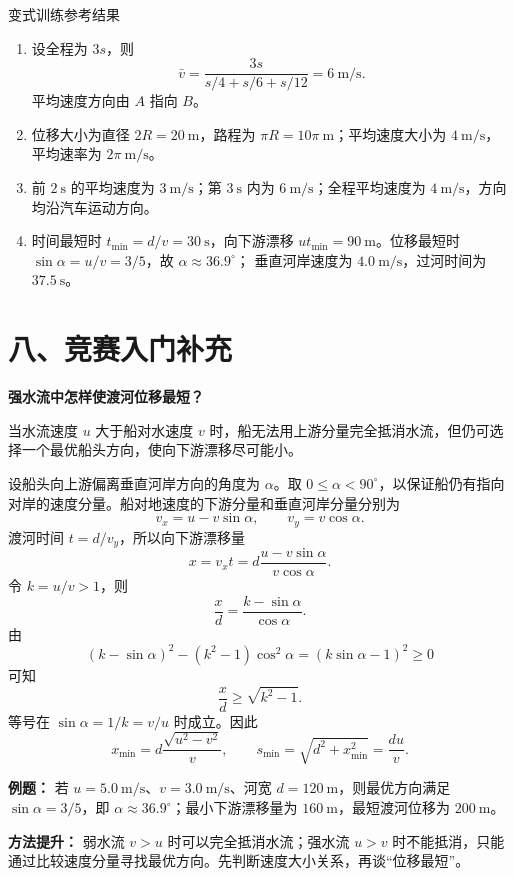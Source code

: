 \begin{learningbox}{变式训练参考结果}
\begin{enumerate}[itemsep=0.45em,topsep=0.3em,parsep=0pt]
  \item 设全程为 $3s$，则
  \[
  \bar v=\frac{3s}{s/4+s/6+s/12}=6\ \mathrm{m/s}.
  \]
  平均速度方向由 $A$ 指向 $B$。
  \item 位移大小为直径 $2R=20\ \mathrm m$，路程为 $\pi R=10\pi\ \mathrm m$；平均速度大小为 $4\ \mathrm{m/s}$，平均速率为 $2\pi\ \mathrm{m/s}$。
  \item 前 $2\ \mathrm s$ 的平均速度为 $3\ \mathrm{m/s}$；第 $3\ \mathrm s$ 内为 $6\ \mathrm{m/s}$；全程平均速度为 $4\ \mathrm{m/s}$，方向均沿汽车运动方向。
  \item 时间最短时 $t_{\min}=d/v=30\ \mathrm s$，向下游漂移
  $ut_{\min}=90\ \mathrm m$。位移最短时
  $\sin\alpha=u/v=3/5$，故 $\alpha\approx36.9^\circ$；
  垂直河岸速度为 $4.0\ \mathrm{m/s}$，过河时间为 $37.5\ \mathrm s$。
\end{enumerate}
\end{learningbox}

\section*{八、竞赛入门补充}

\begin{competitionbox}
\textbf{强水流中怎样使渡河位移最短？}

当水流速度 $u$ 大于船对水速度 $v$ 时，船无法用上游分量完全抵消水流，但仍可选择一个最优船头方向，使向下游漂移尽可能小。

设船头向上游偏离垂直河岸方向的角度为 $\alpha$。取
$0\leqslant\alpha<90^\circ$，以保证船仍有指向对岸的速度分量。船对地速度的下游分量和垂直河岸分量分别为
\[
v_x=u-v\sin\alpha,\qquad
v_y=v\cos\alpha.
\]
渡河时间 $t=d/v_y$，所以向下游漂移量
\[
x=v_xt
=d\frac{u-v\sin\alpha}{v\cos\alpha}.
\]
令 $k=u/v>1$，则
\[
\frac{x}{d}=\frac{k-\sin\alpha}{\cos\alpha}.
\]
由
\[
(k-\sin\alpha)^2-(k^2-1)\cos^2\alpha
=(k\sin\alpha-1)^2\geq0
\]
可知
\[
\frac{x}{d}\geq\sqrt{k^2-1}.
\]
等号在 $\sin\alpha=1/k=v/u$ 时成立。因此
\[
x_{\min}=d\frac{\sqrt{u^2-v^2}}{v},
\qquad
s_{\min}=\sqrt{d^2+x_{\min}^2}=\frac{du}{v}.
\]

\textbf{例题：} 若 $u=5.0\ \mathrm{m/s}$、$v=3.0\ \mathrm{m/s}$、河宽
$d=120\ \mathrm m$，则最优方向满足
$\sin\alpha=3/5$，即 $\alpha\approx36.9^\circ$；最小下游漂移量为
$160\ \mathrm m$，最短渡河位移为 $200\ \mathrm m$。

\textbf{方法提升：} 弱水流 $v>u$ 时可以完全抵消水流；强水流 $u>v$ 时不能抵消，只能通过比较速度分量寻找最优方向。先判断速度大小关系，再谈“位移最短”。
\end{competitionbox}

